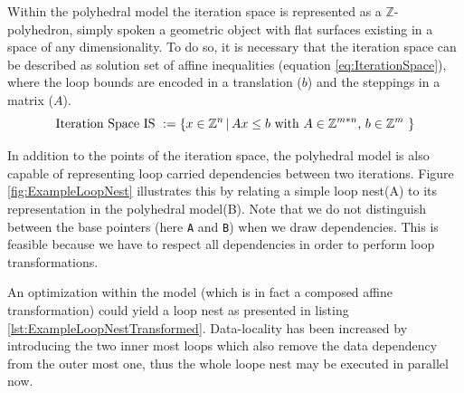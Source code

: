 Within the polyhedral model the iteration space is represented as a $\mathbb{Z}$-polyhedron,
simply spoken a geometric object with flat surfaces existing in a space of any
dimensionality. To do so, it is necessary that the iteration space 
can be described as solution set of affine inequalities
(equation \ref{eq:IterationSpace}), where the loop bounds are encoded in a translation
($b$) and the steppings in a matrix ($A$). 
\begin{equation}
  \text{Iteration Space IS } := \{ x \in \mathbb{Z}^n \, |\, Ax\leq b \text{ with $A\in\mathbb{Z}^{m*n} $, $ b\in\mathbb{Z}^{m}$  } \} \label{eq:IterationSpace}
\end{equation}

In addition to the points of the iteration space, the polyhedral model is also
capable of representing loop carried dependencies between two iterations. 
Figure \ref{fig:ExampleLoopNest} illustrates this by relating a simple loop 
nest({\footnotesize A}) to its representation in the polyhedral 
model({\footnotesize B}). 
Note that we do not distinguish between the base pointers 
(here \texttt{A} and \texttt{B}) when we draw dependencies. 
This is feasible because we have to respect all dependencies in order to perform 
loop transformations. 

An optimization within the model (which is in fact a composed
affine transformation) could yield 
a loop nest as presented in listing \ref{lst:ExampleLoopNestTransformed}. 
Data-locality has been increased by introducing the two inner most loops which
also remove the data dependency from the outer most one, 
thus the whole loope nest may be executed in parallel now.

